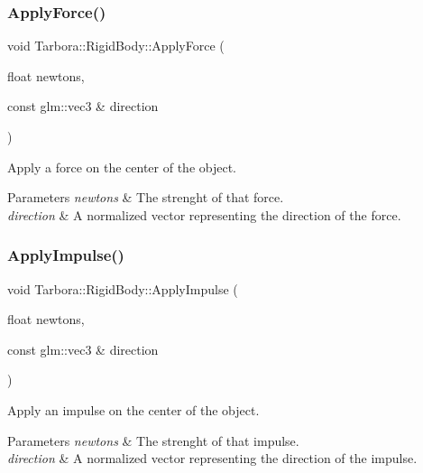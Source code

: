 \subsubsection{\texorpdfstring{Apply\+Force()}{ApplyForce()}}
{\footnotesize\ttfamily void Tarbora\+::\+Rigid\+Body\+::\+Apply\+Force (\begin{DoxyParamCaption}\item[{float}]{newtons,  }\item[{const glm\+::vec3 \&}]{direction }\end{DoxyParamCaption})}



Apply a force on the center of the object. 


\begin{DoxyParams}{Parameters}
{\em newtons} & The strenght of that force. \\
\hline
{\em direction} & A normalized vector representing the direction of the force. \\
\hline
\end{DoxyParams}
\mbox{\label{classTarbora_1_1RigidBody_a55a0003f237d0f1a324350bcf9bbfd28}} 
\subsubsection{\texorpdfstring{Apply\+Impulse()}{ApplyImpulse()}}
{\footnotesize\ttfamily void Tarbora\+::\+Rigid\+Body\+::\+Apply\+Impulse (\begin{DoxyParamCaption}\item[{float}]{newtons,  }\item[{const glm\+::vec3 \&}]{direction }\end{DoxyParamCaption})}



Apply an impulse on the center of the object. 


\begin{DoxyParams}{Parameters}
{\em newtons} & The strenght of that impulse. \\
\hline
{\em direction} & A normalized vector representing the direction of the impulse. \\
\hline
\end{DoxyParams}
\mbox{\label{classTarbora_1_1RigidBody_a025666d2545230e12b546b68d955871c}} 
